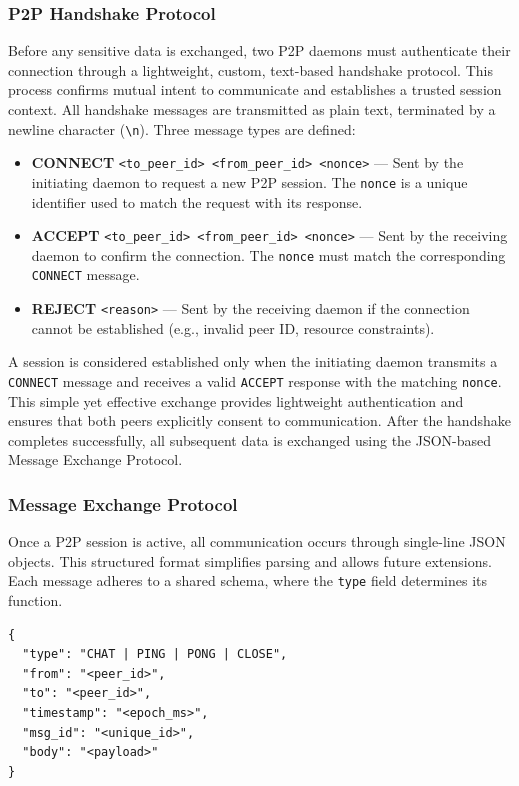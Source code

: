 \subsubsection{P2P Handshake Protocol}
Before any sensitive data is exchanged, two P2P daemons must authenticate their connection through a lightweight, custom, text-based handshake protocol. 
This process confirms mutual intent to communicate and establishes a trusted session context. 
All handshake messages are transmitted as plain text, terminated by a newline character (\texttt{\textbackslash n}). 
Three message types are defined:

\begin{itemize}
    \item \textbf{CONNECT} \texttt{<to\_peer\_id> <from\_peer\_id> <nonce>} — Sent by the initiating daemon to request a new P2P session. The \texttt{nonce} is a unique identifier used to match the request with its response.
    \item \textbf{ACCEPT} \texttt{<to\_peer\_id> <from\_peer\_id> <nonce>} — Sent by the receiving daemon to confirm the connection. The \texttt{nonce} must match the corresponding \texttt{CONNECT} message.
    \item \textbf{REJECT} \texttt{<reason>} — Sent by the receiving daemon if the connection cannot be established (e.g., invalid peer ID, resource constraints).
\end{itemize}

A session is considered established only when the initiating daemon transmits a \texttt{CONNECT} message and receives a valid \texttt{ACCEPT} response with the matching \texttt{nonce}. 
This simple yet effective exchange provides lightweight authentication and ensures that both peers explicitly consent to communication. 
After the handshake completes successfully, all subsequent data is exchanged using the JSON-based Message Exchange Protocol.

\subsubsection{Message Exchange Protocol}
Once a P2P session is active, all communication occurs through single-line JSON objects. 
This structured format simplifies parsing and allows future extensions. 
Each message adheres to a shared schema, where the \texttt{type} field determines its function. 

\begin{lstlisting}
{
  "type": "CHAT | PING | PONG | CLOSE",
  "from": "<peer_id>",
  "to": "<peer_id>",
  "timestamp": "<epoch_ms>",
  "msg_id": "<unique_id>",
  "body": "<payload>"
}
\end{lstlisting}

